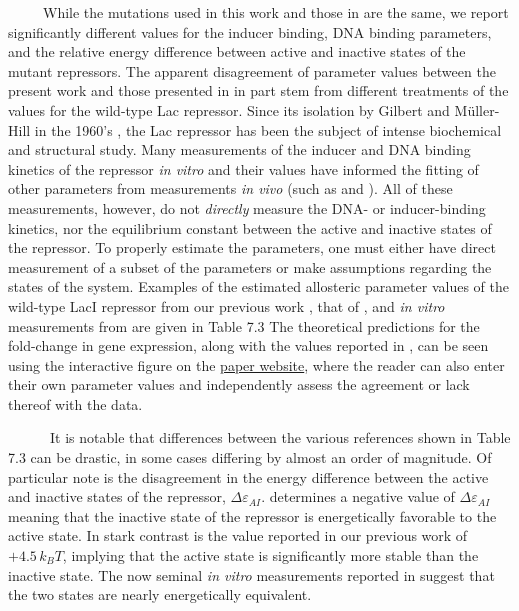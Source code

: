 \documentclass[12pt]{caltech_thesis}
\begin{document}
~~~~~While the mutations used in this work and those in
\textcite{daber2011} are the same, we report significantly different
values for the inducer binding, DNA binding parameters, and the relative
energy difference between active and inactive states of the mutant
repressors. The apparent disagreement of parameter values between the
present work and those presented in \textcite{daber2011} in part stem
from different treatments of the values for the wild-type Lac repressor.
Since its isolation by Gilbert and Müller-Hill in the 1960's
\textcite{gilbert1966}, the Lac repressor has been the subject of
intense biochemical and structural study. Many measurements of the
inducer and DNA binding kinetics of the repressor \emph{in vitro}
\autocite[such as][]{ogorman1980} and their values have informed the
fitting of other parameters from measurements \emph{in vivo} (such as
\textcite{daber2011} and \textcite{daber2009a}). All of these
measurements, however, do not \emph{directly} measure the DNA- or
inducer-binding kinetics, nor the equilibrium constant between the
active and inactive states of the repressor. To properly estimate the
parameters, one must either have direct measurement of a subset of the
parameters or make assumptions regarding the states of the system.
Examples of the estimated allosteric parameter values of the wild-type
LacI repressor from our previous work \autocite{razo-mejia2018}, that of
\textcite{daber2011}, and \emph{in vitro} measurements from
\textcite{ogorman1980} are given in Table 7.3 The theoretical
predictions for the fold-change in gene expression, along with the
values reported in \textcite{daber2009a}, can be seen using the
interactive figure on the
\href{http://rpgroup.caltech.edu/mwc_mutants}{paper website}, where the
reader can also enter their own parameter values and independently
assess the agreement or lack thereof with the data.

~~~~~~It is notable that differences between the various references
shown in Table 7.3 can be drastic, in some cases differing by almost an
order of magnitude. Of particular note is the disagreement in the energy
difference between the active and inactive states of the repressor,
\(\Delta\varepsilon_{AI}\). \textcite{daber2011} determines a negative
value of \(\Delta\varepsilon_{AI}\) meaning that the inactive state of
the repressor is energetically favorable to the active state. In stark
contrast is the value reported in our previous work of \(+4.5\, k_BT\),
implying that the active state is significantly more stable than the
inactive state. The now seminal \emph{in vitro} measurements reported in
\textcite{ogorman1980} suggest that the two states are nearly
energetically equivalent.
\end{document}
